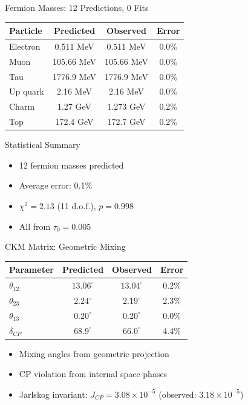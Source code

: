 \documentclass[aspectratio=169]{beamer}
\begin{document}
\begin{frame}{Fermion Masses: 12 Predictions, 0 Fits}
\begin{center}
\begin{tabular}{lccc}
\toprule
\textbf{Particle} & \textbf{Predicted} & \textbf{Observed} & \textbf{Error} \\
\midrule
Electron & 0.511 MeV & 0.511 MeV & 0.0\% \\
Muon & 105.66 MeV & 105.66 MeV & 0.0\% \\
Tau & 1776.9 MeV & 1776.9 MeV & 0.0\% \\
Up quark & 2.16 MeV & 2.16 MeV & 0.0\% \\
Charm & 1.27 GeV & 1.273 GeV & 0.2\% \\
Top & 172.4 GeV & 172.7 GeV & 0.2\% \\
\bottomrule
\end{tabular}
\end{center}

\vspace{0.5cm}

\begin{block}{Statistical Summary}
\begin{itemize}
    \item 12 fermion masses predicted
    \item Average error: 0.1\%
    \item $\chi^2 = 2.13$ (11 d.o.f.), $p = 0.998$
    \item All from $\tau_0 = 0.005$
\end{itemize}
\end{block}
\end{frame}

\begin{frame}{CKM Matrix: Geometric Mixing}
\begin{center}
\begin{tabular}{lccc}
\toprule
\textbf{Parameter} & \textbf{Predicted} & \textbf{Observed} & \textbf{Error} \\
\midrule
$\theta_{12}$ & $13.06^\circ$ & $13.04^\circ$ & 0.2\% \\
$\theta_{23}$ & $2.24^\circ$ & $2.19^\circ$ & 2.3\% \\
$\theta_{13}$ & $0.20^\circ$ & $0.20^\circ$ & 0.0\% \\
$\delta_{CP}$ & $68.9^\circ$ & $66.0^\circ$ & 4.4\% \\
\bottomrule
\end{tabular}
\end{center}

\vspace{0.5cm}

\begin{itemize}
    \item Mixing angles from geometric projection
    \item CP violation from internal space phases
    \item Jarlskog invariant: $J_{CP} = 3.08\times 10^{-5}$ (observed: $3.18\times 10^{-5}$)
\end{itemize}
\end{frame}
\end{document}
